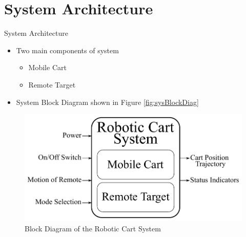 \documentclass{beamer}
\begin{document}

\section{System Architecture}

\begin{frame}{System Architecture}
    \begin{itemize}
        \item Two main components of system
            \begin{itemize}
                \item Mobile Cart
                \item Remote Target
            \end{itemize}
        \item System Block Diagram shown in Figure \autoref{fig:sysBlockDiag}
    \end{itemize}
    \begin{figure}[b]
        \centering
        \includegraphics[width=\textwidth]{figs/system_block_diagram_2}
        \caption{Block Diagram of the Robotic Cart System}
        \label{fig:sysBlockDiag}
    \end{figure}
\end{frame}

\end{document}
